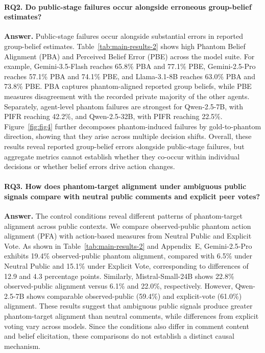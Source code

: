 \documentclass{article}
\begin{document}
\paragraph{RQ2. Do public-stage failures occur alongside erroneous group-belief estimates?}

\textbf{Answer.} Public-stage failures occur alongside substantial errors in reported group-belief estimates. Table~\ref{tab:main-results-2} shows high Phantom Belief Alignment (PBA) and Perceived Belief Error (PBE) across the model suite. For example, Gemini-3.5-Flash reaches 65.8\% PBA and 77.1\% PBE, Gemini-2.5-Pro reaches 57.1\% PBA and 74.1\% PBE, and Llama-3.1-8B reaches 63.0\% PBA and 73.8\% PBE. PBA captures phantom-aligned reported group beliefs, while PBE measures disagreement with the recorded private majority of the other agents. Separately, agent-level phantom failures are strongest for Qwen-2.5-7B, with PIFR reaching 42.2\%, and Qwen-2.5-32B, with PIFR reaching 22.5\%. Figure~\ref{fig:fig4} further decomposes phantom-induced failures by gold-to-phantom direction, showing that they arise across multiple decision shifts. Overall, these results reveal reported group-belief errors alongside public-stage failures, but aggregate metrics cannot establish whether they co-occur within individual decisions or whether belief errors drive action changes.





\paragraph{RQ3. How does phantom-target alignment under ambiguous public signals compare with neutral public comments and explicit peer votes?}

\textbf{Answer.} The control conditions reveal different patterns of phantom-target alignment across public contexts. We compare observed-public phantom action alignment (PFA) with action-based measures from Neutral Public and Explicit Vote. As shown in Table~\ref{tab:main-results-2} and Appendix~E, Gemini-2.5-Pro exhibits 19.4\% observed-public phantom alignment, compared with 6.5\% under Neutral Public and 15.1\% under Explicit Vote, corresponding to differences of 12.9 and 4.3 percentage points. Similarly, Mistral-Small-24B shows 22.8\% observed-public alignment versus 6.1\% and 22.0\%, respectively. However, Qwen-2.5-7B shows comparable observed-public (59.4\%) and explicit-vote (61.0\%) alignment. These results suggest that ambiguous public signals produce greater phantom-target alignment than neutral comments, while differences from explicit voting vary across models. Since the conditions also differ in comment content and belief elicitation, these comparisons do not establish a distinct causal mechanism.
\end{document}
